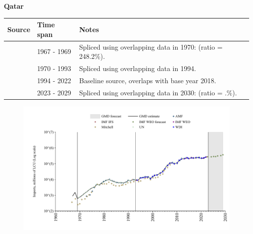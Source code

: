 \documentclass[12pt,a4paper,landscape]{article}
\begin{document}
\begin{adjustbox}{max totalsize={\paperwidth}{\paperheight},center}
\begin{minipage}[t][\textheight][t]{\textwidth}
\vspace*{0.5cm}
{}
\begin{center}
{\Large\bfseries Qatar}
\end{center}
\vspace{0.5cm}
\begin{table}[H]
\centering
\small
\begin{tabular}{|l|l|l|}
\hline
\textbf{Source} & \textbf{Time span} & \textbf{Notes} \\
\hline
\rowcolor{white}\cite{Mitchell}& 1967 - 1969 &Spliced using overlapping data in 1970: (ratio = 248.2\%).\\
\rowcolor{lightgray}\cite{UN}& 1970 - 1993 &Spliced using overlapping data in 1994.\\
\rowcolor{white}\cite{WDI}& 1994 - 2022 &Baseline source, overlaps with base year 2018.\\
\rowcolor{lightgray}\cite{IMF_WEO_forecast}& 2023 - 2029 &Spliced using overlapping data in 2030: (ratio = .\%).\\
\hline
\end{tabular}
\end{table}
\begin{figure}[H]
\centering
\includegraphics[width=\textwidth,height=0.6\textheight,keepaspectratio]{graphs/QAT_imports.pdf}
\end{figure}
\end{minipage}
\end{adjustbox}
\end{document}
